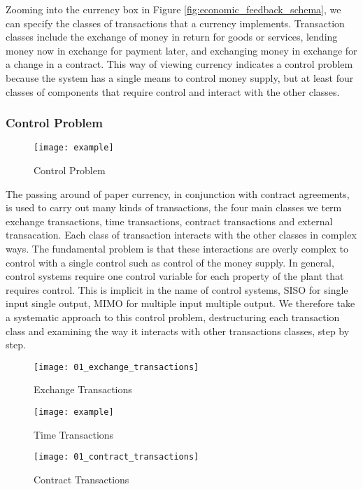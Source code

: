 Zooming into the currency box in Figure \ref{fig:economic_feedback_schema}, we can specify the
classes of transactions that a currency implements. Transaction classes include the exchange of
money in return for goods or services, lending money now in exchange for payment later, and
exchanging money in exchange for a change in a contract. This way of viewing currency indicates a
control problem because the system has a single means to control money supply, but at least four
classes of components that require control and interact with the other classes.

\subsubsection{Control Problem}

\begin{figure}
\centering
\texttt{[image: example]}
\caption{Control Problem}
\label{fig:control_problem}
\end{figure}

The passing around of paper currency, in conjunction with contract agreements, is used to carry
out many kinds of transactions, the four main classes we term exchange transactions, time
transactions, contract transactions and external transacation. Each class of transaction interacts
with the other classes in complex ways. The fundamental problem is that these interactions are
overly complex to control with a single control such as control of the money supply. In general,
control systems require one control variable for each property of the plant that requires control.
This is implicit in the name of control systems, SISO for single input single output, MIMO for
multiple input multiple output. We therefore take a systematic approach to this control problem,
destructuring each transaction class and examining the way it interacts with other transactions
classes, step by step.

\begin{figure}
\centering
\texttt{[image: 01\_exchange\_transactions]}
\caption{Exchange Transactions}
\label{fig:exchange_transactions}
\end{figure}

\begin{figure}
\centering
\texttt{[image: example]}
\caption{Time Transactions}
\label{fig:time_transactions}
\end{figure}

\begin{figure}
\centering
\texttt{[image: 01\_contract\_transactions]}
\caption{Contract Transactions}
\label{fig:contract_transactions}
\end{figure}

